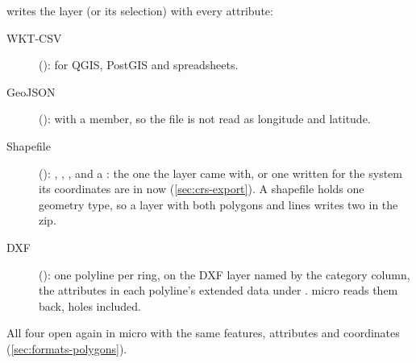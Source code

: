  writes the layer (or its selection) with every attribute:

\begin{description}
\item[WKT-CSV] (): for QGIS, PostGIS and spreadsheets.
\item[GeoJSON] (): with a  member, so the file is not read as longitude
  and latitude.
\item[Shapefile] (): , , ,  and a
  : the one the layer came with, or one written for the system its coordinates are in
  now (\cref{sec:crs-export}). A shapefile holds one geometry type, so a layer with both
  polygons and lines writes two in the zip.
\item[DXF] (): one polyline per ring, on the DXF layer named by the category column, the
  attributes in each polyline's extended data under . micro reads them back, holes
  included.
\end{description}

All four open again in micro with the same features, attributes and coordinates
(\cref{sec:formats-polygons}).
